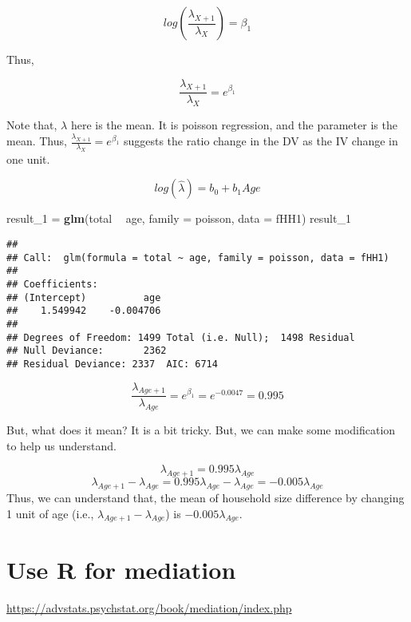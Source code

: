 \documentclass[]{book}
\newenvironment{Shaded}{\begin{snugshade}}{\end{snugshade}}
\newcommand{\DataTypeTok}[1]{\textcolor[rgb]{0.13,0.29,0.53}{#1}}
\newcommand{\DecValTok}[1]{\textcolor[rgb]{0.00,0.00,0.81}{#1}}
\newcommand{\KeywordTok}[1]{\textcolor[rgb]{0.13,0.29,0.53}{\textbf{#1}}}
\newcommand{\NormalTok}[1]{#1}
\newcommand{\OperatorTok}[1]{\textcolor[rgb]{0.81,0.36,0.00}{\textbf{#1}}}
\newcommand{\StringTok}[1]{\textcolor[rgb]{0.31,0.60,0.02}{#1}}
\begin{document}
\[log (\frac{\lambda_{X+1}}{\lambda_X}) =\beta_1\]

Thus,

\[\frac{\lambda_{X+1}}{\lambda_X} =e^{\beta_1}\]

Note that, \(\lambda\) here is the mean. It is poisson regression, and the parameter is the mean. Thus, \(\frac{\lambda_{X+1}}{\lambda_X} =e^{\beta_1}\) suggests the ratio change in the DV as the IV change in one unit.

\[log (\hat{\lambda}) =b_0+b_1 Age\]

\begin{Shaded}
\begin{Highlighting}[]
\NormalTok{result_}\DecValTok{1}\NormalTok{ =}\StringTok{ }\KeywordTok{glm}\NormalTok{(total }\OperatorTok{~}\StringTok{ }\NormalTok{age, }\DataTypeTok{family =}\NormalTok{ poisson, }\DataTypeTok{data =}\NormalTok{ fHH1)}
\NormalTok{result_}\DecValTok{1}
\end{Highlighting}
\end{Shaded}

\begin{verbatim}
## 
## Call:  glm(formula = total ~ age, family = poisson, data = fHH1)
## 
## Coefficients:
## (Intercept)          age  
##    1.549942    -0.004706  
## 
## Degrees of Freedom: 1499 Total (i.e. Null);  1498 Residual
## Null Deviance:       2362 
## Residual Deviance: 2337  AIC: 6714
\end{verbatim}

\[\frac{\lambda_{Age+1}}{\lambda_{Age}} =e^{\beta_1}=e^{-0.0047}=0.995\]

But, what does it mean? It is a bit tricky. But, we can make some modification to help us understand.

\[\lambda_{Age+1} =0.995 \lambda_{Age}\]
\[\lambda_{Age+1} - \lambda_{Age}=0.995 \lambda_{Age}- \lambda_{Age}=-0.005 \lambda_{Age}\]
Thus, we can understand that, the mean of household size difference by changing 1 unit of age (i.e., \(\lambda_{Age+1} - \lambda_{Age}\)) is \(-0.005 \lambda_{Age}\).

\hypertarget{use-r-for-mediation}{%
\section{Use R for mediation}\label{use-r-for-mediation}}

\url{https://advstats.psychstat.org/book/mediation/index.php}


\end{document}
